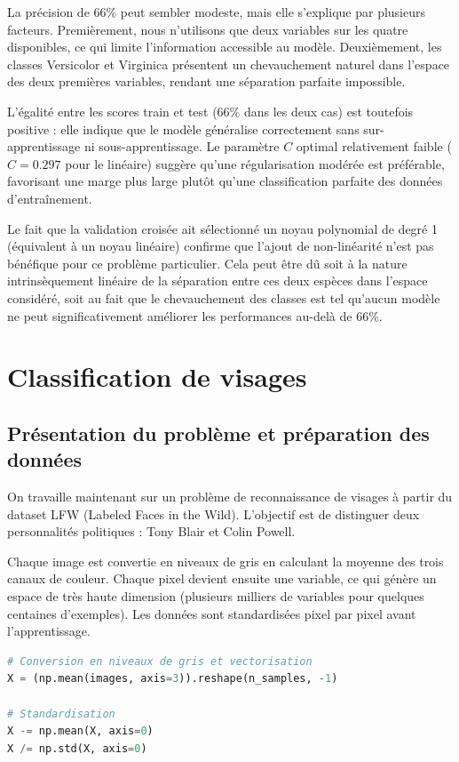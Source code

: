 \documentclass[11pt,a4paper]{article}
\begin{document}
La précision de 66\% peut sembler modeste, mais elle s'explique par plusieurs facteurs. Premièrement, nous n'utilisons que deux variables sur les quatre disponibles, ce qui limite l'information accessible au modèle. Deuxièmement, les classes Versicolor et Virginica présentent un chevauchement naturel dans l'espace des deux premières variables, rendant une séparation parfaite impossible. 

L'égalité entre les scores train et test (66\% dans les deux cas) est toutefois positive : elle indique que le modèle généralise correctement sans sur-apprentissage ni sous-apprentissage. Le paramètre $C$ optimal relativement faible ($C = 0.297$ pour le linéaire) suggère qu'une régularisation modérée est préférable, favorisant une marge plus large plutôt qu'une classification parfaite des données d'entraînement.

Le fait que la validation croisée ait sélectionné un noyau polynomial de degré 1 (équivalent à un noyau linéaire) confirme que l'ajout de non-linéarité n'est pas bénéfique pour ce problème particulier. 
Cela peut être dû soit à la nature intrinsèquement linéaire de la séparation entre ces deux espèces dans l'espace considéré, soit au fait que le chevauchement des classes est tel qu'aucun modèle ne peut significativement améliorer les performances au-delà de 66\%.

\section{Classification de visages}

\subsection{Présentation du problème et préparation des données}

On travaille maintenant sur un problème de reconnaissance de visages à partir du dataset LFW (Labeled Faces in the Wild). L'objectif est de distinguer deux personnalités politiques : Tony Blair et Colin Powell. 

Chaque image est convertie en niveaux de gris en calculant la moyenne des trois canaux de couleur. Chaque pixel devient ensuite une variable, ce qui génère un espace de très haute dimension (plusieurs milliers de variables pour quelques centaines d'exemples). Les données sont standardisées pixel par pixel avant l'apprentissage.

\begin{lstlisting}[language=Python, caption=Extraction des caractéristiques et standardisation]
# Conversion en niveaux de gris et vectorisation
X = (np.mean(images, axis=3)).reshape(n_samples, -1)

# Standardisation
X -= np.mean(X, axis=0)
X /= np.std(X, axis=0)
\end{lstlisting}
\end{document}
